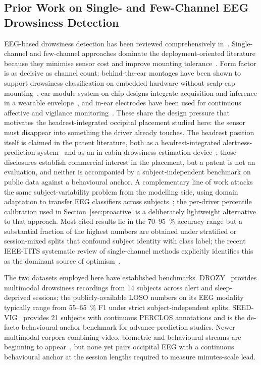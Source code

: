 \documentclass[journal]{IEEEtran}
\DeclareRobustCommand{\add}[1]{#1}                         %
\DeclareRobustCommand{\add}[1]{\hl{#1}}
\begin{document}
\subsection{\add{Prior Work on Single- and Few-Channel EEG Drowsiness Detection}}
\label{sec:related}
EEG-based drowsiness detection has been reviewed comprehensively in~\cite{stancin2021review,sahayadhas2012sensors,chowdhury2018access,balam2024review}. Single-channel and few-channel approaches dominate the deployment-oriented literature because they minimise sensor cost and improve mounting tolerance~\cite{larocco2020headsets,gangadharan2020wireless,minimal2024electrodes}. \add{Form factor is as decisive as channel count: behind-the-ear montages have been shown to support drowsiness classification on embedded hardware without scalp-cap mounting~\mbox{\cite{nguyen2023behindear}}, ear-module system-on-chip designs integrate acquisition and inference in a wearable envelope~\mbox{\cite{ha2016earmodule}}, and in-ear electrodes have been used for continuous affective and vigilance monitoring~\mbox{\cite{athavipach2019inear}}. These share the design pressure that motivates the headrest-integrated occipital placement studied here: the sensor must disappear into something the driver already touches. The headrest position itself is claimed in the patent literature, both as a headrest-integrated alertness-prediction system~\mbox{\cite{nunez2025patent}} and as an in-cabin drowsiness-estimation device~\mbox{\cite{toyota2021patent}}; those disclosures establish commercial interest in the placement, but a patent is not an evaluation, and neither is accompanied by a subject-independent benchmark on public data against a behavioural anchor. A complementary line of work attacks the same subject-variability problem from the modelling side, using domain adaptation to transfer EEG classifiers across subjects~\mbox{\cite{maswanganyi2025transfer}}; the per-driver percentile calibration used in Section~\mbox{\ref{sec:proactive}} is a deliberately lightweight alternative to that approach.} Most cited results lie in the 70--95~\% accuracy range but a substantial fraction of the highest numbers are obtained under stratified or session-mixed splits that confound subject identity with class label; the recent IEEE-TITS systematic review of single-channel methods explicitly identifies this as the dominant source of optimism~\cite{balam2024review}.

The two datasets employed here have established benchmarks. DROZY~\cite{drozy2016} provides multimodal drowsiness recordings from 14 subjects across alert and sleep-deprived sessions; the publicly-available LOSO numbers on its EEG modality typically range from 55--65~\% F1 under strict subject-independent splits. SEED-VIG~\cite{zheng2017seedvig} provides 21 subjects with continuous PERCLOS annotations and is the de-facto behavioural-anchor benchmark for advance-prediction studies. \add{Newer multimodal corpora combining video, biometric and behavioural streams are beginning to appear~\mbox{\cite{eeguldd2025}}, but none yet pairs occipital EEG with a continuous behavioural anchor at the session lengths required to measure minutes-scale lead.}
\end{document}
